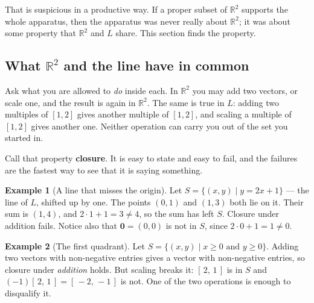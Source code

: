 \documentclass[11pt]{article}
\theoremstyle{definition}
\newtheorem{ex}{Example}[section]
\theoremstyle{remark}
\newcommand{\R}{\mathbb{R}}
\newcommand{\vc}[1]{\mathbf{#1}}
\begin{document}
That is suspicious in a productive way. If a proper subset of $\R^{2}$ supports
the whole apparatus, then the apparatus was never really about $\R^{2}$; it was
about some property that $\R^{2}$ and $L$ share. This section finds the
property.

\subsection{What \texorpdfstring{$\R^{2}$}{R2} and the line have in common}
Ask what you are allowed to \emph{do} inside each. In $\R^{2}$ you may add two
vectors, or scale one, and the result is again in $\R^{2}$. The same is true in
$L$: adding two multiples of $[1,2]$ gives another multiple of $[1,2]$, and
scaling a multiple of $[1,2]$ gives another one. Neither operation can carry you
out of the set you started in.

Call that property \textbf{closure}. It is easy to state and easy to fail, and
the failures are the fastest way to see that it is saying something.

\begin{ex}[A line that misses the origin]
Let $S=\{(x,y)\mid y=2x+1\}$ --- the line of $L$, shifted up by one. The points
$(0,1)$ and $(1,3)$ both lie on it. Their sum is $(1,4)$, and
$2\cdot1+1=3\neq4$, so the sum has left $S$. Closure under addition fails.
Notice also that $\vc{0}=(0,0)$ is not in $S$, since $2\cdot0+1=1\neq0$.
\end{ex}

\begin{ex}[The first quadrant]
Let $S=\{(x,y)\mid x\ge0 \text{ and } y\ge0\}$. Adding two vectors with
non-negative entries gives a vector with non-negative entries, so closure under
\emph{addition} holds. But scaling breaks it: $[\,2,\,1\,]$ is in $S$ and
$(-1)[\,2,\,1\,]=[\,-2,\,-1\,]$ is not. One of the two operations is enough to
disqualify it.
\end{ex}
\end{document}
